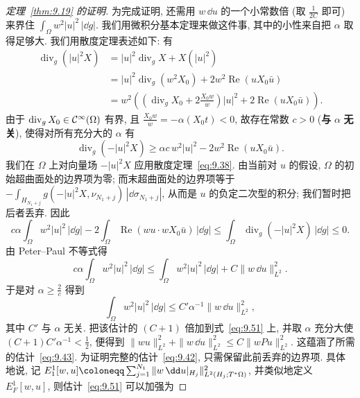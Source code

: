 \begin{proof}[定理~\ref{thm:9.19} 的证明]
为完成证明, 还需用 $w \, \dd u$ 的一个小常数倍 (取 $\frac{1}{2C}$ 即可) 来界住 $\int_{\Omega} w^2 |u|^2 \, |\dd g|$. 我们用微积分基本定理来做这件事, 其中的小性来自把 $\alpha$ 取得足够大. 我们用散度定理表述如下: 有
\begin{equation}\label{eq:9.52}
    \begin{aligned}
        \operatorname{div}_g(|u|^2 X) &= |u|^2 \operatorname{div}_g X + X(|u|^2) \\
        &= |u|^2 \operatorname{div}_g (w^2 X_0) + 2w^2 \operatorname{Re}(u X_0 \bar u) \\
        &= w^2 \left( \left( \operatorname{div}_g X_0 + 2 \frac{X_0 w}{w} \right) |u|^2 + 2\operatorname{Re}(u X_0 \bar u) \right).
    \end{aligned}
\end{equation}
由于 $\operatorname{div}_g X_0 \in \mathcal{C}^\infty(\Omega)$ 有界, 且 $\frac{X_0 w}{w} = -\alpha (X_0 t) < 0$, 故存在常数 $c > 0$ (\textbf{与} $\alpha$ \textbf{无关}), 使得对所有充分大的 $\alpha$ 有
\begin{equation}\label{eq:9.53}
    \operatorname{div}_g(-|u|^2 X) \ge \alpha c \, w^2 |u|^2 - 2w^2 \operatorname{Re}(u X_0 \bar u).
\end{equation}
我们在 $\Omega$ 上对向量场 $-|u|^2 X$ 应用散度定理~\eqref{eq:9.38}. 由当前对 $u$ 的假设, $\Omega$ 的初始超曲面处的边界项为零; 而末超曲面处的边界项等于 $-\int_{H_{N_1+j}} g(-|u|^2 X, \nu_{N_1+j}) \, |\dd \sigma_{N_1+j}|$, 从而是 $u$ 的负定二次型的积分; 我们暂时把后者丢弃. 因此
\begin{equation}\label{eq:9.54}
    c\alpha \int_{\Omega} w^2 |u|^2 \, |\dd g| - 2 \int_{\Omega} \operatorname{Re}(w u \cdot w X_0 \bar u) \, |\dd g| \le \int_{\Omega} \operatorname{div}_g(-|u|^2 X) \, |\dd g| \le 0.
\end{equation}
由 Peter--Paul 不等式得
\begin{equation}\label{eq:9.55}
    c\alpha \int_{\Omega} w^2 |u|^2 \, |\dd g| \le \int_{\Omega} w^2 |u|^2 \, |\dd g| + C \|w \, \dd u\|_{L^2}^2.
\end{equation}
于是对 $\alpha \ge \frac{2}{c}$ 得到
\begin{equation}\label{eq:9.56}
    \int_{\Omega} w^2 |u|^2 \, |\dd g| \le C' \alpha^{-1} \|w \, \dd u\|_{L^2}^2,
\end{equation}
其中 $C'$ 与 $\alpha$ 无关. 把该估计的 $(C+1)$ 倍加到式~\eqref{eq:9.51} 上, 并取 $\alpha$ 充分大使 $(C+1)C'\alpha^{-1} < \frac12$, 便得到 $\|w u\|_{L^2}^2 + \|w \, \dd u\|_{L^2}^2 \le C \|w P u\|_{L^2}^2$. 这蕴涵了所需的估计~\eqref{eq:9.43}. 为证明完整的估计~\eqref{eq:9.42}, 只需保留此前丢弃的边界项. 具体地说, 记 $E_1^1[w, u] \defeq \sum_{j=1}^{N_1} \|w \, \dd u|_{H_j}\|_{L^2(H_j; T^* \Omega)}^2$, 并类似地定义 $E_F^1[w, u]$, 则估计~\eqref{eq:9.51} 可以加强为

\end{proof}
